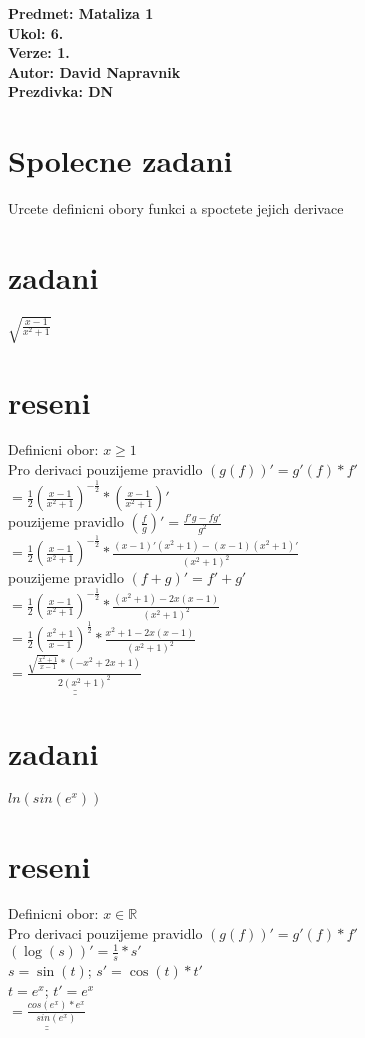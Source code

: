 \documentclass[a4paper]{article}
\def\doubleunderline#1{\underline{\underline{#1}}}
\begin{document}
\noindent
\textbf{Predmet: Mataliza 1}\\
\textbf{Ukol: 6.}\\
\textbf{Verze: 1.}\\
\textbf{Autor: David Napravnik}\\
\textbf{Prezdivka: DN}

\section*{Spolecne zadani}
Urcete definicni obory funkci a spoctete jejich derivace
\section*{zadani}
$\sqrt{\frac{x-1}{x^2+1}}$

\section*{reseni}
Definicni obor: $x \geq 1$\\
Pro derivaci pouzijeme pravidlo $(g(f))' = g'(f) * f'$\\
$=\frac{1}{2}\left(\frac{x-1}{x^2+1}\right)^{-\frac{1}{2}} * \left(\frac{x-1}{x^2+1}\right)'$\\
pouzijeme pravidlo $\left(\frac{f}{g}\right)' = \frac{f'g - fg'}{g^2}$\\
$
	=\frac{1}{2}\left(\frac{x-1}{x^2+1}\right)^{-\frac{1}{2}} * 
	\frac{(x-1)'(x^2+1) - (x-1)(x^2+1)'}{(x^2+1)^2}
$\\
pouzijeme pravidlo $(f+g)' = f' + g'$\\
$
	=\frac{1}{2}\left(\frac{x-1}{x^2+1}\right)^{-\frac{1}{2}} * 
	\frac{(x^2+1) - 2x(x-1)}{(x^2+1)^2}
$\\
$
	=\frac{1}{2}\left(\frac{x^2+1}{x-1}\right)^{\frac{1}{2}} * 
	\frac{x^2 + 1 - 2x(x-1)}{(x^2+1)^2}
$\\
$
	\doubleunderline{=\frac{\sqrt{\frac{x^2+1}{x-1}} * (-x^2 +2x +1)}{2(x^2+1)^2}}
$\\





\section*{zadani}
$ln(sin(e^x))$

\section*{reseni}
Definicni obor: $x \in \mathbb{R}$\\
Pro derivaci pouzijeme pravidlo $(g(f))' = g'(f) * f'$\\
$(\log(s))' = \frac{1}{s} * s'$\\
$s=\sin(t)$; $s' = \cos(t) * t'$\\
$t = e^x$; $t' = e^x$\\
$\doubleunderline{=\frac{cos(e^x)*e^x}{sin(e^x)}}$
\end{document}
